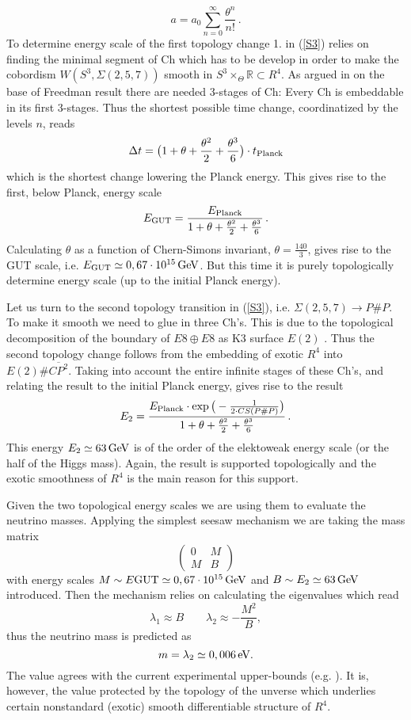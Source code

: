 \documentclass[12pt]{article}
\begin{document}
\begin{equation}\label{exp1} a=a_0\sum_{n=0}^{\infty}\frac{\theta^n}{n!}\,. \end{equation}
To determine energy scale of the first topology change 1. in (\ref{S3}) relies on finding the minimal segment of Ch which has to be develop in order to make the cobordism $W(S^3,\Sigma(2,5,7))$ smooth in $S^3\times_{\Theta}\mathbb{R}\subset R^4$. As argued in \cite{AK2014,AK2019} on the base of Freedman result there are needed 3-stages of Ch: Every Ch is embeddable in its first 3-stages. Thus the shortest possible time change, coordinatized by the levels $n$, reads \cite{AK2014,AK2019} 
\[ \Delta t= \big(1+ \theta + \frac{\theta^2}{2}+\frac{\theta^3}{6}\big)\cdot t_{\rm Planck} \]
which is the shortest change lowering the Planck energy. This gives rise to the first, below Planck, energy scale
\[E_{\rm GUT}= \frac{E_{\rm Planck}}{1+ \theta + \frac{\theta^2}{2}+\frac{\theta^3}{6}}\,. \] 
Calculating $\theta$ as a function of Chern-Simons invariant, $\theta=\frac{140}{3}$, gives rise to the GUT scale, i.e. $E_{\rm GUT}\simeq 0,67\cdot 10^{15}\, {\rm GeV}$. But this time it is purely topologically determine energy scale (up to the initial Planck energy). 

Let us turn to the second topology transition in (\ref{S3}), i.e. $\Sigma(2,5,7)\to P\#P$. To make it smooth we need to glue in three Ch's. This is due to the topological decomposition of the boundary of $E8\oplus E8$ as K3 surface $E(2)$ \cite{AK2018,AK2019}. Thus the second topology change follows from the embedding of exotic $R^4$ into $E(2)\# \overline{CP^2}$. Taking into account the entire infinite stages of these Ch's, and relating the result to the initial Planck energy, gives rise to the result 
\[E_2=\frac{E_{\rm Planck}\cdot \exp\big(-\frac{1}{2\cdot CS(P\# P)}\big)}{1+\theta +\frac{\theta^2}{2}+\frac{\theta^3}{6}}\,. \]
This energy $E_2\simeq 63\, {\rm GeV}$ is of the order of the elektoweak energy scale (or the half of the Higgs mass). Again, the result is supported topologically and the exotic smoothness of $R^4$ is the main reason for this support. 

Given the two topological energy scales we are using them to evaluate the neutrino masses. Applying the simplest seesaw mechanism we are taking the mass matrix 
\[
\left(\begin{array}{cc}
0 & M\\
M & B
\end{array}\right)
\] with energy scales $M\sim {E\rm GUT}\simeq 0,67\cdot 10^{15}\, {\rm GeV}$ and $B\sim E_2\simeq 63\, {\rm GeV}$ introduced. Then the mechanism relies on calculating the eigenvalues which read \[
\lambda_{1}\approx B\qquad\lambda_{2}\approx-\frac{M^{2}}{B},
\] thus the neutrino mass is predicted as 
\[m=\lambda_2\simeq 0,006\, {\rm eV}.   \] The value agrees with the current experimental upper-bounds (e.g. \cite{PlanckCosmoParam2015,Neutrino2015}). It is, however, the value protected by the topology of the unverse which underlies certain nonstandard (exotic) smooth differentiable structure of $R^4$. 
\end{document}
